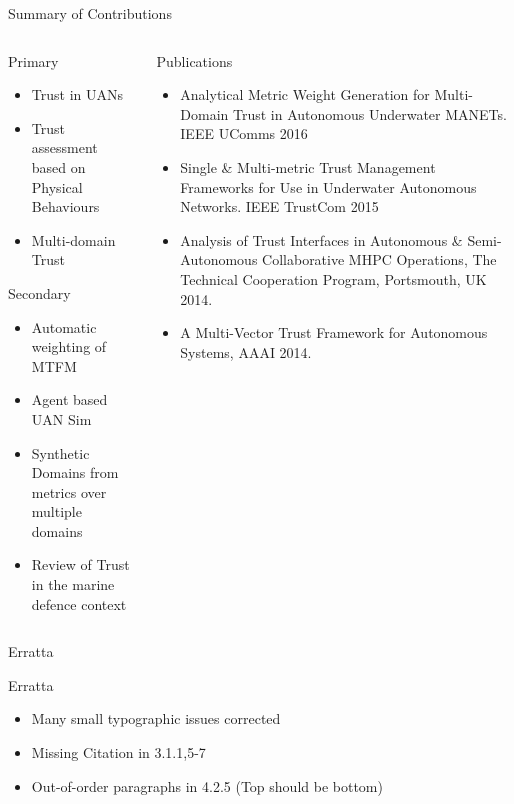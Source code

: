 \documentclass[aspectratio=43]{beamer}
\begin{document}
\begin{frame}{Summary of Contributions}
	\begin{columns}
		\begin{column}{0.45\textwidth}
			\begin{exampleblock}{Primary}
				\begin{itemize}
					\item Trust in UANs
					\item Trust assessment based on Physical Behaviours
					\item Multi-domain Trust 
				\end{itemize}
			\end{exampleblock}
			\begin{block}{Secondary}
				\begin{itemize}
					\item Automatic weighting of MTFM
					\item Agent based UAN Sim
					\item Synthetic Domains from metrics over multiple domains
					\item Review of Trust in the marine defence context
				\end{itemize}
			\end{block}
		\end{column}
		\begin{column}{0.56\textwidth}
			\begin{block}{Publications}
				\begin{itemize}  
					\item Analytical Metric Weight Generation for Multi-Domain Trust in Autonomous Underwater MANETs. IEEE UComms 2016
					\item Single \& Multi-metric Trust Management Frameworks for Use in Underwater Autonomous Networks. IEEE TrustCom 2015
					\item Analysis of Trust Interfaces in Autonomous \& Semi-Autonomous Collaborative MHPC Operations, The Technical Cooperation Program, Portsmouth, UK 2014.
					\item A Multi-Vector Trust Framework for Autonomous Systems, AAAI 2014.
				\end{itemize}  
			\end{block}
		\end{column}
	\end{columns}
\end{frame}

\begin{frame}{Erratta}
	\begin{alertblock}{Erratta}
		\begin{itemize}
			\item Many small typographic issues corrected
			\item Missing Citation in 3.1.1,5-7 
			\item Out-of-order paragraphs in 4.2.5 (Top should be bottom)
		\end{itemize}
	\end{alertblock}
	
\end{frame}
\end{document}
